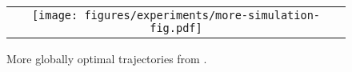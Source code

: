 
\begin{figure*}[t!]
    \centering
    \begin{minipage}{\linewidth}
        \centering
        \begin{tabular}{c}
            \begin{minipage}{\linewidth}
                \centering
                \texttt{[image: figures/experiments/more-simulation-fig.pdf]}
            \end{minipage}
        \end{tabular}
    \end{minipage}

    \caption{More globally optimal trajectories from \spot. \label{fig:exp:more-simulation}}
\end{figure*}